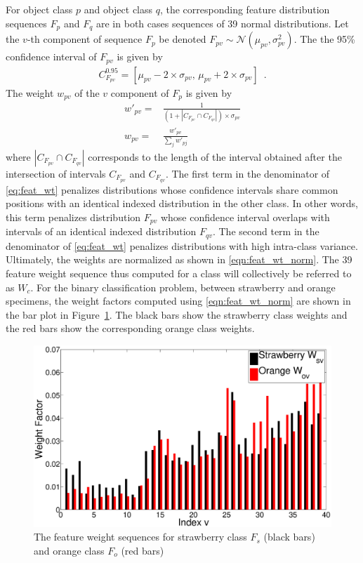 \documentclass {udthesis}
\begin{document}
For object class $p$ and object class $q$, the corresponding feature distribution sequences $F_p$ and $F_q$ are in both cases sequences of 39 normal distributions. Let the $v$-th component of sequence $F_p$ be denoted $F_{pv}\sim\mathcal{N}(\mu_{pv},\sigma^2_{pv})$.
The the 95\% confidence interval of $F_{pv}$ is given by
%
\begin{align}	\label{eqn:conf_interval}
C^{0.95}_{F_{pv}}=[\mu_{pv}-2 \times \sigma_{pv},\, \mu_{pv}+2 \times \sigma_{pv}]\enspace .
\end{align}
%
The weight $w_{pv}$ of the $v$ component of $F_p$ is given by
\begin{align}
 w'_{pv}= & \frac{1}{(1+ |C_{F_{pv}} \cap C_{F_{qv}}| )\times \sigma_{pv}} \label{eq:feat_wt}\\
 w_{pv}= & \frac{w'_{pv}}{\sum_{j} w'_{pj}} \label{eqn:feat_wt_norm}
\end{align}
where $|C_{F_{pv}} \cap C_{F_{qv}}|$ corresponds to the length of the interval obtained after the intersection of intervals $C_{F_{pv}}$ and $C_{F_{qv}}$. The first term in the denominator of \eqref{eq:feat_wt} penalizes distributions whose confidence intervals share common positions with an identical indexed distribution in the other class. In other words, this term penalizes distribution $F_{pv}$ whose confidence interval overlaps with intervals of an identical indexed distribution $F_{qv}$. The second term in the denominator of \eqref{eq:feat_wt} penalizes distributions with high intra-class variance. Ultimately, the weights are normalized as shown in \eqref{eqn:feat_wt_norm}. The 39 feature weight sequence thus computed for a class will collectively be referred to as $W_c$. For the binary classification problem, between strawberry and orange specimens, the weight factors computed using \eqref{eqn:feat_wt_norm} are shown in the bar plot in Figure~\ref{fig:feat_weights}. The black bars show the strawberry 
class 
weights and the red 
bars show the corresponding orange class weights.
%
\begin{figure}
  \centering
  \includegraphics[width=\textwidth]{feature_weights}
  \caption[Feature weights]{The feature weight sequences for strawberry class $F_s$ (black bars) and orange class $F_o$ (red bars)}
  \label{fig:feat_weights}
\end{figure}	
%
\end{document}
